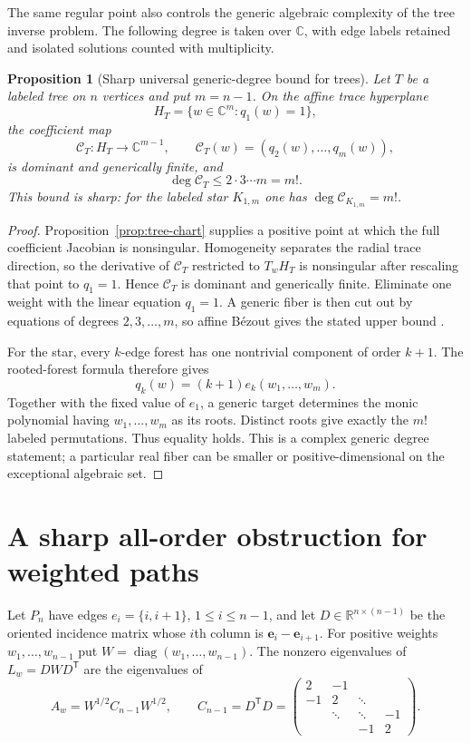 \documentclass[11pt,reqno]{amsart}
\newtheorem{proposition}[theorem]{Proposition}
\theoremstyle{definition}
\theoremstyle{remark}
\newcommand{\R}{\mathbb R}
\newcommand{\diag}{\operatorname{diag}}
\begin{document}
The same regular point also controls the generic algebraic complexity of the
tree inverse problem.  The following degree is taken over $\mathbb C$, with
edge labels retained and isolated solutions counted with multiplicity.

\begin{proposition}[Sharp universal generic-degree bound for trees]
\label{prop:tree-degree}
Let $T$ be a labeled tree on $n$ vertices and put $m=n-1$.  On the affine
trace hyperplane
\[
 H_T=\{w\in\mathbb C^m:q_1(w)=1\},
\]
the coefficient map
\[
 \mathcal C_T:H_T\longrightarrow\mathbb C^{m-1},\qquad
 \mathcal C_T(w)=(q_2(w),\ldots,q_m(w)),
\]
is dominant and generically finite, and
\[
 \deg\mathcal C_T\le 2\cdot3\cdots m=m!.
\]
This bound is sharp: for the labeled star $K_{1,m}$ one has
$\deg\mathcal C_{K_{1,m}}=m!$.
\end{proposition}

\begin{proof}
Proposition~\ref{prop:tree-chart} supplies a positive point at which the full
coefficient Jacobian is nonsingular.  Homogeneity separates the radial trace
direction, so the derivative of $\mathcal C_T$ restricted to $T_wH_T$ is
nonsingular after rescaling that point to $q_1=1$.  Hence $\mathcal C_T$ is
dominant and generically finite.  Eliminate one weight with the linear
equation $q_1=1$.  A generic fiber is then cut out by equations of degrees
$2,3,\ldots,m$, so affine B\'ezout gives the stated upper bound
\cite{CoxLittleOShea2005}.

For the star, every $k$-edge forest has one nontrivial component of order
$k+1$.  The rooted-forest formula therefore gives
\[
 q_k(w)=(k+1)e_k(w_1,\ldots,w_m).
\]
Together with the fixed value of $e_1$, a generic target determines the monic
polynomial having $w_1,\ldots,w_m$ as its roots.  Distinct roots give exactly
the $m!$ labeled permutations.  Thus equality holds.  This is a complex
generic degree statement; a particular real fiber can be smaller or
positive-dimensional on the exceptional algebraic set.
\end{proof}

\section{A sharp all-order obstruction for weighted paths}\label{sec:path}

Let $P_n$ have edges $e_i=\{i,i+1\}$, $1\le i\le n-1$, and let
$D\in\R^{n\times(n-1)}$ be the oriented incidence matrix whose $i$th column
is $\mathbf e_i-\mathbf e_{i+1}$.  For positive weights
$w_1,\ldots,w_{n-1}$ put $W=\diag(w_1,\ldots,w_{n-1})$.  The nonzero
eigenvalues of $L_w=DWD^{\mathsf T}$ are the eigenvalues of
\begin{equation}\label{eq:cartan-congruence}
 A_w=W^{1/2}C_{n-1}W^{1/2},\qquad
 C_{n-1}=D^{\mathsf T}D=
 \begin{pmatrix}
 2&-1\\
 -1&2&\ddots\\
 &\ddots&\ddots&-1\\
 &&-1&2
 \end{pmatrix}.
\end{equation}
\end{document}
